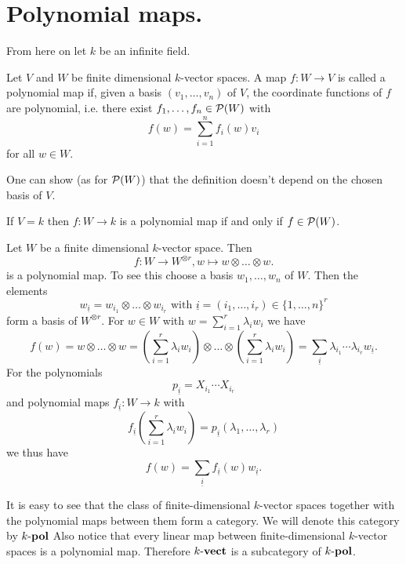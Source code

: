 

\section{Polynomial maps.}


From here on let $k$ be an infinite field.


\begin{defi}
 Let $V$ and $W$ be finite dimensional $k$-vector spaces. A map $f : W \to V$ is called a polynomial map if, given a basis $(v_1, \ldots, v_n)$ of $V$, the coordinate functions of $f$ are polynomial, i.e. there exist $f_1, \ldots, f_n \in \mathcal{P}(W)$ with
 \[
  f(w) = \sum_{i=1}^n f_i(w) v_i
 \]
 for all $w \in W$.
\end{defi}


\begin{rem}
 One can show (as for $\mathcal{P}(W)$) that the definition doesn’t depend on the chosen basis of $V$.
\end{rem}


\begin{rem}
 If $V = k$ then $f : W \to k$ is a polynomial map if and only if $f \in \mathcal{P}(W)$.
\end{rem}


\begin{expl}
 Let $W$ be a finite dimensional $k$-vector space. Then
 \[
  f : W \to W^{\otimes r}, w \mapsto w \otimes \ldots \otimes w.
 \]
 is a polynomial map. To see this choose a basis $w_1, \ldots, w_n$ of $W$. Then the elements
 \[
  w_{\underline{i}} = w_{i_1} \otimes \ldots \otimes w_{i_r} \text{ with } \underline{i} = (i_1, \ldots, i_r) \in \{1, \ldots, n\}^r
 \]
 form a basis of $W^{\otimes r}$. For $w \in W$ with $w = \sum_{i=1}^r \lambda_i w_i$ we have
 \[
  f(w)
  = w \otimes \ldots \otimes w
  = \left( \sum_{i=1}^r \lambda_i w_i \right) \otimes \ldots \otimes \left( \sum_{i=1}^r \lambda_i w_i \right)
  = \sum_{\underline{i}} \lambda_{i_1} \cdots \lambda_{i_r} w_{\underline{i}}.
 \]
 For the polynomials
 \[
  p_{\underline{i}} = X_{i_1} \cdots X_{i_r}
 \]
 and polynomial maps $f_{\underline{i}} : W \to k$ with
 \[
  f_{\underline{i}}\left(\sum_{i=1}^r \lambda_i w_i\right) = p_{\underline{i}}(\lambda_1, \ldots, \lambda_r)
 \]
 we thus have
 \[
  f(w) = \sum_{\underline{i}} f_{\underline{i}}(w) w_{\underline{i}}.
 \]
\end{expl}


It is easy to see that the class of finite-dimensional $k$-vector spaces together with the polynomial maps between them form a category. We will denote this category by $k\text{-}\mathbf{pol}$  Also notice that every linear map between finite-dimensional $k$-vector spaces is a polynomial map. Therefore $k\text{-}\mathbf{vect}$ is a subcategory of $k\text{-}\mathbf{pol}$.


